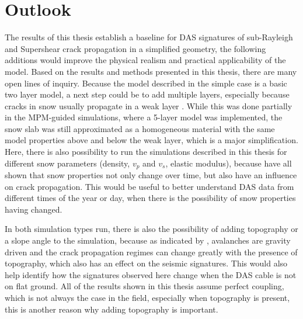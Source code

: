 \chapter{Outlook}
\label{chap:outlook}
%
%

The results of this thesis establish a baseline for DAS signatures of sub-Rayleigh and Supershear crack propagation in a simplified geometry, the following additions would improve the physical realism and practical applicability of the model. Based on the results and methods presented in this thesis, there are many open lines of inquiry. Because the model described in the simple case is a basic two layer model, a next step could be to add multiple layers, especially because cracks in snow usually propagate in a weak layer \parencite{schweizerSnowAvalancheFormation2003}. While this was done partially in the MPM-guided simulations, where a 5-layer model was implemented, the snow slab was still approximated as a homogeneous material with the same model properties above and below the weak layer, which is a major simplification. Here, there is also possibility to run the simulations described in this thesis for different snow parameters (density, $v_p$ and $v_s$, elastic modulus), because \cite{barteltPhysicalSNOWPACKModel2002,mulakNumericalInvestigationMixedmode2019,bobillierMicromechanicalModelingSnow2020} have all shown that snow properties not only change over time, but also have an influence on crack propagation. This would be useful to better understand DAS data from different times of the year or day, when there is the possibility of snow properties having changed. \par

In both simulation types run, there is also the possibility of adding topography or a slope angle to the simulation, because as indicated by \cite{anceySnowAvalanches2001,trottetTransitionSubRayleighAnticrack2022}, avalanches are gravity driven and the crack propagation regimes can change greatly with the presence of topography, which also has an effect on the seismic signatures. This would also help identify how the signatures observed here change when the DAS cable is not on flat ground. All of the results shown in this thesis assume perfect coupling, which is not always the case in the field, especially when topography is present, this is another reason why adding topography is important. \par 

